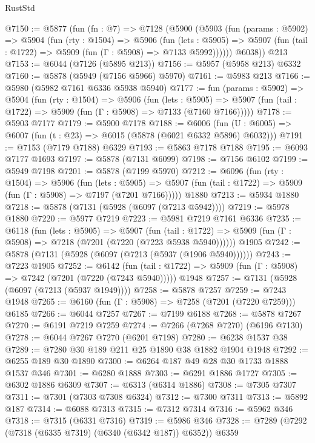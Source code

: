 \begin{lexlean}{RustStd}
\begin{coremodule}
@7150 := @5877
    (fun (fn : @7) =>
    @7128
      (@5900
        (@5903
          (fun (params : @5902) =>
          @5904
            (fun (rty : @1504) =>
            @5906
              (fun (lets : @5905) =>
              @5907 (fun (tail : @1722) => @5909 (fun (Γ : @5908) => @7133 @5992))))))
        @6038))
    @213
@7153 := @6044 (@7126 (@5895 @213))
@7156 := @5957 (@5958 @213) @6332
@7160 := @5878 (@5949 (@7156 @5966) @5970)
@7161 := @5983 @213
@7166 := @5980 (@5982 @7161 @6336 @5938 @5940)
@7177 := fun (params : @5902) =>
  @5904
    (fun (rty : @1504) =>
    @5906
      (fun (lets : @5905) =>
      @5907 (fun (tail : @1722) => @5909 (fun (Γ : @5908) => @7133 (@7160 @7166)))))
@7178 := @5903 @7177
@7179 := @5900 @7178
@7188 := @6006 (fun (U : @6005) => @6007 (fun (t : @23) => @6015 (@5878 (@6021 @6332 @5896) @6032)))
@7191 := @7153 (@7179 @7188) @6329
@7193 := @5863 @7178 @7188
@7195 := @6093 @7177 @1693
@7197 := @5878 (@7131 @6099)
@7198 := @7156 @6102
@7199 := @5949 @7198
@7201 := @5878 (@7199 @5970)
@7212 := @6096
    (fun (rty : @1504) =>
    @5906
      (fun (lets : @5905) =>
      @5907 (fun (tail : @1722) => @5909 (fun (Γ : @5908) => @7197 (@7201 @7166)))))
    @1880
@7213 := @5934 @1880
@7218 := @5878 (@7131 (@5928 (@6097 (@7213 @5942))))
@7219 := @5978 @1880
@7220 := @5977 @7219
@7223 := @5981 @7219 @7161 @6336
@7235 := @6118
    (fun (lets : @5905) =>
    @5907
      (fun (tail : @1722) => @5909 (fun (Γ : @5908) => @7218 (@7201 (@7220 (@7223 @5938 @5940))))))
    @1905
@7242 := @5878 (@7131 (@5928 (@6097 (@7213 (@5937 (@1906 @5940))))))
@7243 := @7223 @1905
@7252 := @6142
    (fun (tail : @1722) => @5909 (fun (Γ : @5908) => @7242 (@7201 (@7220 (@7243 @5940)))))
    @1948
@7257 := @7131 (@5928 (@6097 (@7213 (@5937 @1949))))
@7258 := @5878 @7257
@7259 := @7243 @1948
@7265 := @6160 (fun (Γ : @5908) => @7258 (@7201 (@7220 @7259))) @6185
@7266 := @6044 @7257
@7267 := @7199 @6188
@7268 := @5878 @7267
@7270 := @6191 @7219 @7259
@7274 := @7266 (@7268 @7270) (@6196 @7130)
@7278 := @6044 @7267 @7270 (@6201 @7198)
@7280 := @6238 @1537 @38
@7289 := @7280 @30 @189 @211 @25 @1890 @38 @1882 @1904 @1948
@7292 := @6255 @189 @30 @1890
@7300 := @6264 @187 @49 @28 @30 @1733 @1888 @1537 @346
@7301 := @6280 @1888
@7303 := @6291 @1886 @1727
@7305 := @6302 @1886 @6309
@7307 := @6313 (@6314 @1886)
@7308 := @7305 @7307
@7311 := @7301 (@7303 @7308 @6324)
@7312 := @7300 @7311
@7313 := @5892 @187
@7314 := @6088 @7313
@7315 := @7312 @7314
@7316 := @5962 @346
@7318 := @7315 (@6331 @7316)
@7319 := @5986 @346
@7328 := @7289 (@7292 (@7318 (@6335 @7319) (@6340 (@6342 @187)) @6352)) @6359

\end{coremodule}
\end{lexlean}
